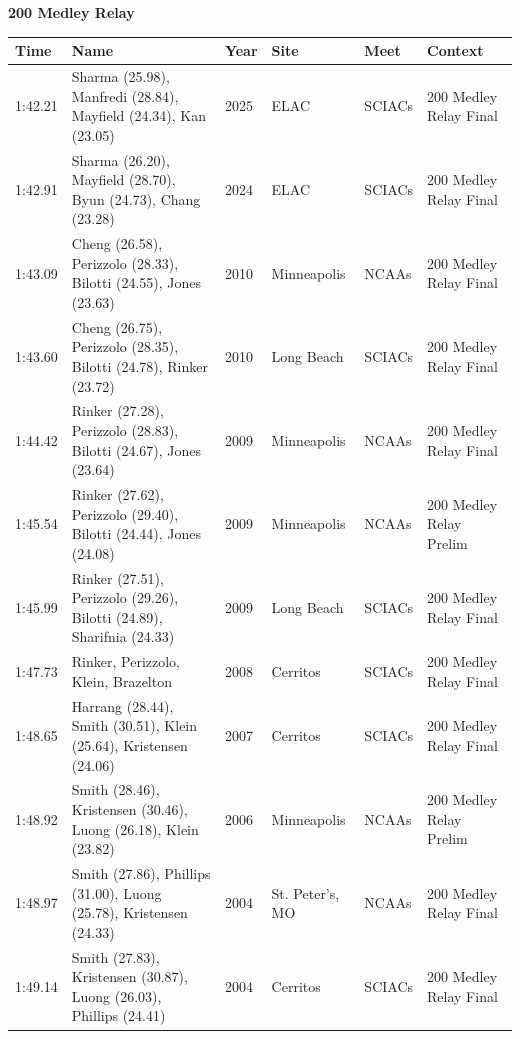 \noindent\begin{minipage}[t]{0.98\textwidth}
\centering
\textbf{\textcolor{teamprimary}{200 Medley Relay}}\par
\vspace{0.5em}
\centering
\small
\renewcommand{\arraystretch}{1.0}
\setlength{\tabcolsep}{4pt}
\begin{tabular}{@{}p{2.0cm}p{3.2cm}p{1.2cm}p{2.0cm}p{2.0cm}p{2.5cm}@{}}
\toprule
\textbf{Time} & \textbf{Name} & \textbf{Year} & \textbf{Site} & \textbf{Meet} & \textbf{Context} \\
\midrule
1:42.21 & Sharma (25.98), Manfredi (28.84), Mayfield (24.34), Kan (23.05) & 2025 & ELAC & SCIACs & 200 Medley Relay Final \\
1:42.91 & Sharma (26.20), Mayfield (28.70), Byun (24.73), Chang (23.28) & 2024 & ELAC & SCIACs & 200 Medley Relay Final \\
1:43.09 & Cheng (26.58), Perizzolo (28.33), Bilotti (24.55), Jones (23.63) & 2010 & Minneapolis & NCAAs & 200 Medley Relay Final \\
1:43.60 & Cheng (26.75), Perizzolo (28.35), Bilotti (24.78), Rinker (23.72) & 2010 & Long Beach & SCIACs & 200 Medley Relay Final \\
1:44.42 & Rinker (27.28), Perizzolo (28.83), Bilotti (24.67), Jones (23.64) & 2009 & Minneapolis & NCAAs & 200 Medley Relay Final \\
1:45.54 & Rinker (27.62), Perizzolo (29.40), Bilotti (24.44), Jones (24.08) & 2009 & Minneapolis & NCAAs & 200 Medley Relay Prelim \\
1:45.99 & Rinker (27.51), Perizzolo (29.26), Bilotti (24.89), Sharifnia (24.33) & 2009 & Long Beach & SCIACs & 200 Medley Relay Final \\
1:47.73 & Rinker, Perizzolo, Klein, Brazelton & 2008 & Cerritos & SCIACs & 200 Medley Relay Final \\
1:48.65 & Harrang (28.44), Smith (30.51), Klein (25.64), Kristensen (24.06) & 2007 & Cerritos & SCIACs & 200 Medley Relay Final \\
1:48.92 & Smith (28.46), Kristensen (30.46), Luong (26.18), Klein (23.82) & 2006 & Minneapolis & NCAAs & 200 Medley Relay Prelim \\
1:48.97 & Smith (27.86), Phillips (31.00), Luong (25.78), Kristensen (24.33) & 2004 & St. Peter's, MO & NCAAs & 200 Medley Relay Final \\
1:49.14 & Smith (27.83), Kristensen (30.87), Luong (26.03), Phillips (24.41) & 2004 & Cerritos & SCIACs & 200 Medley Relay Final \\
\bottomrule
\end{tabular}
\end{minipage}
